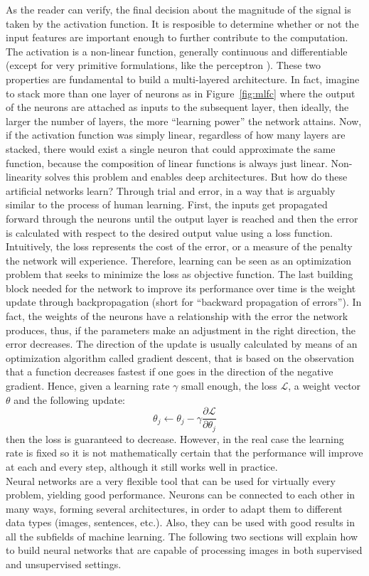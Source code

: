 \noindent As the reader can verify, the final decision about the magnitude of the signal is taken by the activation function. It is resposible to determine whether or not the input features are important enough to further contribute to the computation. The activation is a non-linear function, generally continuous and differentiable (except for very primitive formulations, like the perceptron \cite{rosenblatt1961principles}). These two properties are fundamental to build a multi-layered architecture. In fact, imagine to stack more than one layer of neurons as in Figure~\ref{fig:mlfc} where the output of the neurons are attached as inputs to the subsequent layer, then ideally, the larger the number of layers, the more ``learning power'' the network attains. Now, if the activation function was simply linear, regardless of how many layers are stacked, there would exist a single neuron that could approximate the same function, because the composition of linear functions is always just linear. Non-linearity solves this problem and enables deep architectures. But how do these artificial networks learn? Through trial and error, in a way that is arguably similar to the process of human learning. First, the inputs get propagated forward through the neurons until the output layer is reached and then the error is calculated with respect to the desired output value using a loss function. Intuitively, the loss represents the cost of the error, or a measure of the penalty the network will experience. Therefore, learning can be seen as an optimization problem that seeks to minimize the loss as objective function. The last building block needed for the network to improve its performance over time is the weight update through backpropagation (short for ``backward propagation of errors''). In fact, the weights of the neurons have a relationship with the error the network produces, thus, if the parameters make an adjustment in the right direction, the error decreases. The direction of the update is usually calculated by means of an optimization algorithm called gradient descent, that is based on the observation that a function decreases fastest if one goes in the direction of the negative gradient. Hence, given a learning rate $\gamma$ small enough, the loss $\mathcal{L}$, a weight vector $\theta$ and the following update:
\begin{equation}
  \theta_j \leftarrow \theta_j - \gamma\frac{\partial \mathcal{L}}{\partial \theta_j}
\end{equation}
then the loss is guaranteed to decrease. However, in the real case the learning rate is fixed so it is not mathematically certain that the performance will improve at each and every step, although it still works well in practice.\\
Neural networks are a very flexible tool that can be used for virtually every problem, yielding good performance. Neurons can be connected to each other in many ways, forming several architectures, in order to adapt them to different data types (images, sentences, etc.). Also, they can be used with good results in all the subfields of machine learning. The following two sections will explain how to build neural networks that are capable of processing images in both supervised and unsupervised settings.

